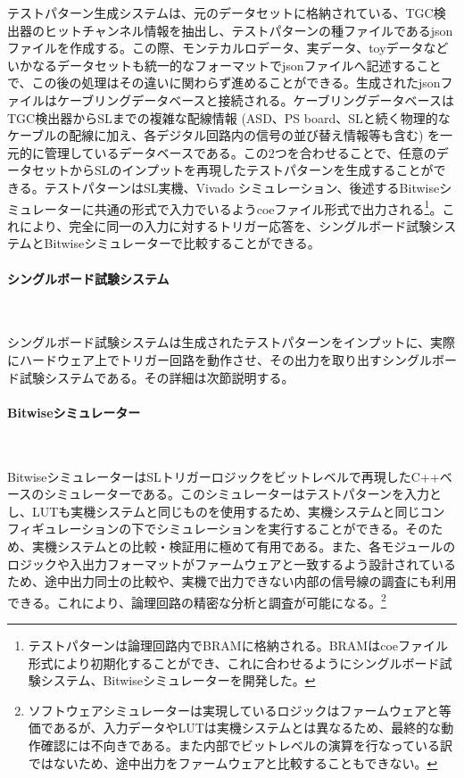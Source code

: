 テストパターン生成システムは、元のデータセットに格納されている、TGC検出器のヒットチャンネル情報を抽出し、テストパターンの種ファイルであるjsonファイルを作成する。この際、モンテカルロデータ、実データ、toyデータなどいかなるデータセットも統一的なフォーマットでjsonファイルへ記述することで、この後の処理はその違いに関わらず進めることができる。生成されたjsonファイルはケーブリングデータベースと接続される。ケーブリングデータベースはTGC検出器からSLまでの複雑な配線情報 (ASD、PS board、SLと続く物理的なケーブルの配線に加え、各デジタル回路内の信号の並び替え情報等も含む) を一元的に管理しているデータベースである。この2つを合わせることで、任意のデータセットからSLのインプットを再現したテストパターンを生成することができる。テストパターンはSL実機、Vivado シミュレーション、後述するBitwiseシミュレーターに共通の形式で入力でいるようcoeファイル形式で出力される\footnote{テストパターンは論理回路内でBRAMに格納される。BRAMはcoeファイル形式により初期化することができ、これに合わせるようにシングルボード試験システム、Bitwiseシミュレーターを開発した。}。これにより、完全に同一の入力に対するトリガー応答を、シングルボード試験システムとBitwiseシミュレーターで比較することができる。

\paragraph{シングルボード試験システム}　　
\par
シングルボード試験システムは生成されたテストパターンをインプットに、実際にハードウェア上でトリガー回路を動作させ、その出力を取り出すシングルボード試験システムである。その詳細は次節説明する。

\paragraph{Bitwiseシミュレーター}　　
\par
BitwiseシミュレーターはSLトリガーロジックをビットレベルで再現したC++ベースのシミュレーターである。このシミュレーターはテストパターンを入力とし、LUTも実機システムと同じものを使用するため、実機システムと同じコンフィギュレーションの下でシミュレーションを実行することができる。そのため、実機システムとの比較・検証用に極めて有用である。また、各モジュールのロジックや入出力フォーマットがファームウェアと一致するよう設計されているため、途中出力同士の比較や、実機で出力できない内部の信号線の調査にも利用できる。これにより、論理回路の精密な分析と調査が可能になる。\footnote{ソフトウェアシミュレーターは実現しているロジックはファームウェアと等価であるが、入力データやLUTは実機システムとは異なるため、最終的な動作確認には不向きである。また内部でビットレベルの演算を行なっている訳ではないため、途中出力をファームウェアと比較することもできない。}

